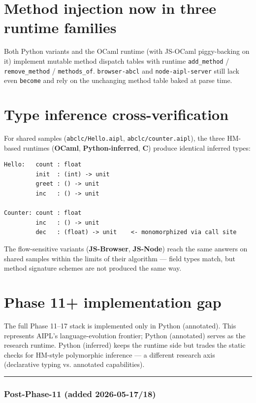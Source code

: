 \documentclass[10pt,a4paper,landscape]{article}
\begin{document}
\section*{Method injection \textemdash{} now in three runtime families}

Both Python variants and the OCaml runtime (with JS-OCaml piggy-backing
on it) implement mutable method dispatch tables with runtime
\texttt{add\_method} / \texttt{remove\_method} / \texttt{methods\_of}.
\texttt{browser-abcl} and \texttt{node-aipl-server} still lack even
\texttt{become} and rely on the unchanging method table baked at
parse time.

\section*{Type inference cross-verification}

For shared samples (\texttt{abclc/Hello.aipl},
\texttt{abclc/counter.aipl}), the three HM-based runtimes
(\textbf{OCaml}, \textbf{Python-inferred}, \textbf{C}) produce
identical inferred types:

\begin{verbatim}
Hello:   count : float
         init  : (int) -> unit
         greet : () -> unit
         inc   : () -> unit

Counter: count : float
         inc   : () -> unit
         dec   : (float) -> unit    <- monomorphized via call site
\end{verbatim}

The flow-sensitive variants (\textbf{JS-Browser},
\textbf{JS-Node}) reach the same answers on shared samples within
the limits of their algorithm — field types match, but method
signature schemes are not produced the same way.

\section*{Phase 11+ implementation gap}

The full Phase 11--17 stack is implemented only in Python
(annotated).  This represents AIPL's language-evolution frontier;
Python (annotated) serves as the research runtime.  Python
(inferred) keeps the runtime side but trades the static checks for
HM-style polymorphic inference --- a different research axis
(declarative typing vs. annotated capabilities).

\bigskip
\hrule
\smallskip

\noindent\small
\subsubsection*{Post-Phase-11 (added 2026-05-17/18)}
\end{document}
